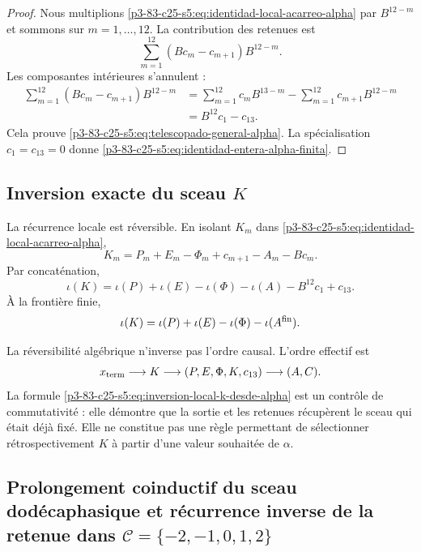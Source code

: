 \begin{proof}
Nous multiplions \eqref{p3-83-c25-s5:eq:identidad-local-acarreo-alpha} par
\(B^{12-m}\) et sommons sur \(m=1,\ldots,12\). La contribution des
retenues est
\[
 \sum_{m=1}^{12}
 (Bc_m-c_{m+1})B^{12-m}.
\]
Les composantes intérieures s’annulent :
\begin{align*}
 \sum_{m=1}^{12}(Bc_m-c_{m+1})B^{12-m}
 &=\sum_{m=1}^{12}c_mB^{13-m}
   -\sum_{m=1}^{12}c_{m+1}B^{12-m}\\
 &=B^{12}c_1-c_{13}.
\end{align*}
Cela prouve \eqref{p3-83-c25-s5:eq:telescopado-general-alpha}. La spécialisation
\(c_1=c_{13}=0\) donne \eqref{p3-83-c25-s5:eq:identidad-entera-alpha-finita}.
\end{proof}

\subsection{Inversion exacte du sceau \texorpdfstring{\(K\)}{K}}

La récurrence locale est réversible. En isolant \(K_m\) dans
\eqref{p3-83-c25-s5:eq:identidad-local-acarreo-alpha},
\begin{equation}
 \boxed{
 K_m=P_m+E_m-\Phi_m+c_{m+1}-A_m-Bc_m.}
 \label{p3-83-c25-s5:eq:inversion-local-k-desde-alpha}
\end{equation}
Par concaténation,
\begin{equation}
 \boxed{
 \iota(K)
 =\iota(P)+\iota(E)-\iota(\Phi)-\iota(A)
  -B^{12}c_1+c_{13}.}
 \label{p3-83-c25-s5:eq:inversion-concatenada-k-desde-alpha}
\end{equation}
À la frontière finie,
\[
 \iota(K)
 =\iota(P)+\iota(E)-\iota(\Phi)-\iota(A^{\rm fin}).
\]

La réversibilité algébrique n’inverse pas l’ordre causal. L’ordre effectif
est
\[
 x_{\rm term}
 \longrightarrow K
 \longrightarrow(P,E,\Phi,K,c_{13})
 \longrightarrow(A,C).
\]
La formule \eqref{p3-83-c25-s5:eq:inversion-local-k-desde-alpha} est un contrôle de
commutativité : elle démontre que la sortie et les retenues récupèrent le sceau
qui était déjà fixé. Elle ne constitue pas une règle permettant de sélectionner
rétrospectivement \(K\) à partir d’une valeur souhaitée de \(\alpha\).

\subsection{Prolongement coinductif du sceau dodécaphasique et récurrence inverse de la retenue dans \(\mathcal C=\{-2,-1,0,1,2\}\)}

